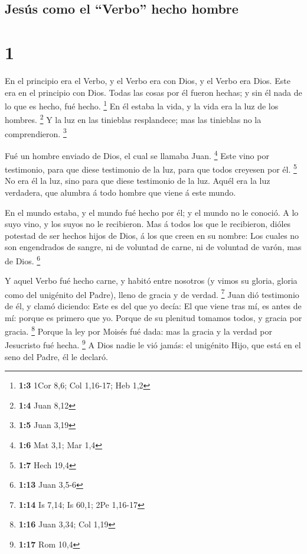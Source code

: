 \hypertarget{jesuxfas-como-el-verbo-hecho-hombre}{%
\subsection{Jesús como el ``Verbo'' hecho
hombre}\label{jesuxfas-como-el-verbo-hecho-hombre}}

\hypertarget{section}{%
\section{1}\label{section}}

 En el principio era el Verbo, y el Verbo era con Dios, y el
Verbo era Dios.  Este era en el principio con Dios.
 Todas las cosas por él fueron hechas; y sin él nada de lo
que es hecho, fué hecho. \footnote{\textbf{1:3} 1Cor 8,6; Col 1,16-17;
  Heb 1,2}  En él estaba la vida, y la vida era la luz de
los hombres. \footnote{\textbf{1:4} Juan 8,12}  Y la luz en
las tinieblas resplandece; mas las tinieblas no la comprendieron.
\footnote{\textbf{1:5} Juan 3,19}

 Fué un hombre enviado de Dios, el cual se llamaba Juan.
\footnote{\textbf{1:6} Mat 3,1; Mar 1,4}  Este vino por
testimonio, para que diese testimonio de la luz, para que todos creyesen
por él. \footnote{\textbf{1:7} Hech 19,4}  No era él la luz,
sino para que diese testimonio de la luz.  Aquél era la luz
verdadera, que alumbra á todo hombre que viene á este mundo.

 En el mundo estaba, y el mundo fué hecho por él; y el
mundo no le conoció.  A lo suyo vino, y los suyos no le
recibieron.  Mas á todos los que le recibieron, dióles
potestad de ser hechos hijos de Dios, á los que creen en su nombre:
 Los cuales no son engendrados de sangre, ni de voluntad de
carne, ni de voluntad de varón, mas de Dios. \footnote{\textbf{1:13}
  Juan 3,5-6}

 Y aquel Verbo fué hecho carne, y habitó entre nosotros (y
vimos su gloria, gloria como del unigénito del Padre), lleno de gracia y
de verdad. \footnote{\textbf{1:14} Is 7,14; Is 60,1; 2Pe 1,16-17}
 Juan dió testimonio de él, y clamó diciendo: Este es del
que yo decía: El que viene tras mí, es antes de mí: porque es primero
que yo.  Porque de su plenitud tomamos todos, y gracia por
gracia. \footnote{\textbf{1:16} Juan 3,34; Col 1,19} 
Porque la ley por Moisés fué dada: mas la gracia y la verdad por
Jesucristo fué hecha. \footnote{\textbf{1:17} Rom 10,4}  A
Dios nadie le vió jamás: el unigénito Hijo, que está en el seno del
Padre, él le declaró.

